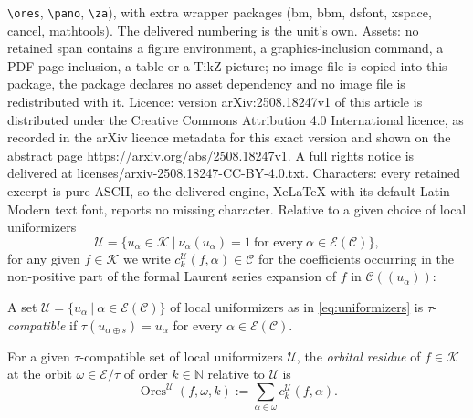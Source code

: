 \documentclass[10pt,a4paper]{amsart}
\DeclareMathOperator{\ores}{Ores}
\newcommand{\Ca}{\mathcal{C}} %
\newcommand{\bk}{\mathcal{K}} %
\newcommand{\ec}{\mathcal{E}} %
\newcommand{\orbita}{{\ec/\tau}} %
\begin{document}
\texttt{\textbackslash ores}, \texttt{\textbackslash pano}, \texttt{\textbackslash za}), with extra wrapper packages (bm, bbm, dsfont, xspace, cancel, mathtools). The delivered numbering is the unit's own. Assets: no retained span contains a figure environment, a graphics-inclusion command, a PDF-page inclusion, a table or a TikZ picture; no image file is copied into this package, the package declares no asset dependency and no image file is redistributed with it. Licence: version arXiv:2508.18247v1 of this article is distributed under the Creative Commons Attribution 4.0 International licence, as recorded in the arXiv licence metadata for this exact version and shown on the abstract page https://arxiv.org/abs/2508.18247v1. A full rights notice is delivered at licenses/arxiv-2508.18247-CC-BY-4.0.txt. Characters: every retained excerpt is pure ASCII, so the delivered engine, XeLaTeX with its default Latin Modern text font, reports no missing character.
Relative to a given choice of local uniformizers \begin{equation}\label{eq:uniformizers}\mathcal{U}=\bigl\{u_\alpha \in\bk \ \big| \ \nu_\alpha(u_\alpha)=1 \ \text{for every} \ \alpha\in\ec(\Ca)\bigr\},\end{equation} for any given $f\in\bk$ we write $c_k^\mathcal{U}(f,\alpha)\in\Ca$ for the coefficients occurring in the non-positive part of the formal Laurent series expansion of $f$ in $\Ca((u_\alpha))$:

\begin{definition} \label{def:uniformizers}
    A set $\mathcal{U}=\{u_\alpha\ | \ \alpha\in\ec(\Ca)\}$ of local uniformizers as in \eqref{eq:uniformizers} is $\tau$-\emph{compatible} if $\tau(u_{\alpha\oplus s})=u_\alpha$ for every $\alpha\in\ec(\Ca)$.
\end{definition}

\begin{definition} \label{def:oresa} For a given $\tau$-compatible set of local uniformizers $\mathcal{U}$, the \emph{orbital residue} of $f\in\bk$ at the orbit $\omega\in\orbita$ of order $k\in\mathbb{N}$ relative to $\mathcal{U}$ is \[\ores^\mathcal{U}(f,\omega,k):=\sum_{\alpha\in\omega}c_k^\mathcal{U}(f,\alpha).\]  
\end{definition}
\end{document}
